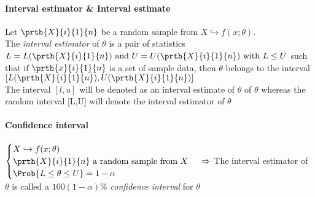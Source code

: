 \paragraph{Interval estimator \& Interval estimate}
Let $\prth{X}{i}{1}{n}$ be a random sample from $X\hookrightarrow f(x;\theta)$.\\
The \emph{interval estimator} of $\theta$ is a pair of statistics $L=
L(\prth{X}{i}{1}{n})\text{ and }U=U(\prth{X}{i}{1}{n})\text{ with }
L\leq U$ such that if $\prth{x}{i}{1}{n}$ is a set of sample data, then
$\theta$ belongs to the interval $\left[L(\prth{X}{i}{1}{n}),U(\prth{X}{i}{1}{n})\right]$\\
The interval $[l,u]$ will be denoted as an interval estimate of $\theta$ of $\theta$ whereas the random interval [L,U] will denote the 
interval estimator of $\theta$

\paragraph{Confidence interval}
$
\begin{cases}
	X\hookrightarrow f(x;\theta)\\
	\prth{X}{i}{1}{n}\text{ a random sample from }X\\
	\Prob{L\leq\theta\leq U}=1-\alpha
\end{cases}\\
\Rightarrow
$ The interval estimator of $\theta$ is called a $100(1-\alpha)\%$ 
\emph{confidence interval} for $\theta$
